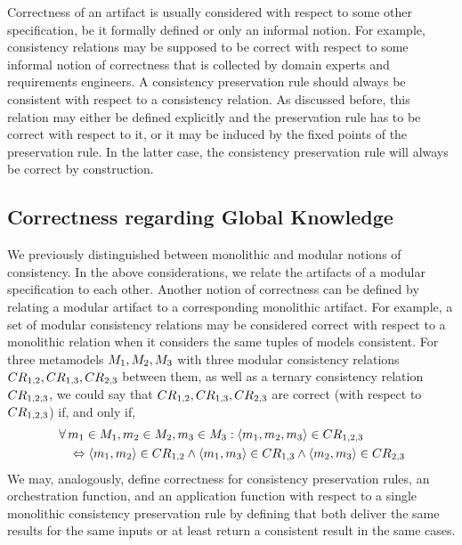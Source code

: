 Correctness of an artifact is usually considered with respect to some other specification, be it formally defined or only an informal notion.
For example, consistency relations may be supposed to be correct with respect to some informal notion of correctness that is collected by domain experts and requirements engineers.
A consistency preservation rule should always be consistent with respect to a consistency relation. As discussed before, this relation may either be defined explicitly and the preservation rule has to be correct with respect to it, or it may be induced by the fixed points of the preservation rule.
In the latter case, the consistency preservation rule will always be correct by construction.


\subsection{Correctness regarding Global Knowledge}

We previously distinguished between monolithic and modular notions of consistency.
In the above considerations, we relate the artifacts of a modular %
specification to each other.
Another notion of correctness can be defined by relating a modular artifact to a corresponding monolithic artifact.
For example, a set of modular consistency relations may be considered correct with respect to a monolithic relation when it considers the same tuples of models consistent.
For three metamodels $\metamodel{M}{1}, \metamodel{M}{2}, \metamodel{M}{3}$ with three modular consistency relations $\consistencyrelation{CR}{1,2}, \consistencyrelation{CR}{1,3}, \consistencyrelation{CR}{2,3}$ between them, as well as a ternary consistency relation $\consistencyrelation{CR}{1,2,3}$, we could say that $\consistencyrelation{CR}{1,2}, \consistencyrelation{CR}{1,3}, \consistencyrelation{CR}{2,3}$ are correct (with respect to $\consistencyrelation{CR}{1,2,3}$) if, and only if,
\begin{align*}
    & \forall \model{m}{1} \in \metamodel{M}{1}, \model{m}{2} \in \metamodel{M}{2}, \model{m}{3} \in \metamodel{M}{3}: \tupled{\model{m}{1}, \model{m}{2}, \model{m}{3}} \in \consistencyrelation{CR}{1,2,3} \\
    & \formulaskip
    \equivalent \tupled{\model{m}{1}, \model{m}{2}} \in \consistencyrelation{CR}{1,2} \land \tupled{\model{m}{1}, \model{m}{3}} \in \consistencyrelation{CR}{1,3} \land \tupled{\model{m}{2}, \model{m}{3}} \in \consistencyrelation{CR}{2,3}
\end{align*}
%
We may, analogously, define correctness for consistency preservation rules, an orchestration function, and an application function with respect to a single monolithic consistency preservation rule by defining that both deliver the same results for the same inputs or at least return a consistent result in the same cases.

